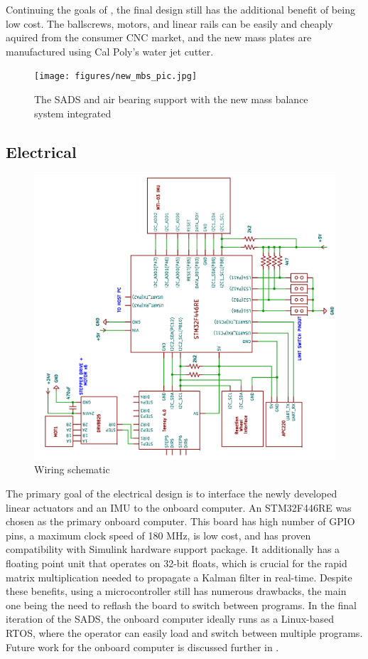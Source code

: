 Continuing the goals of \cite{gilman_automatic_2024}, the final design still has the additional benefit of being low cost. The ballscrews, motors, and linear rails can be easily and cheaply aquired from the consumer CNC market, and the new mass plates are manufactured using Cal Poly's water jet cutter.

\begin{figure}[h]
    \centering
    \texttt{[image: figures/new\_mbs\_pic.jpg]}
    \caption{The SADS and air bearing support with the new mass balance system integrated}
    \label{fig:new_mbs_pic}
\end{figure}

\subsection{Electrical}\label{sec:electrical}

\begin{figure}[h]\label{fig:wiring}
    \centering
    \includegraphics[width=\linewidth,angle=-90]{figures/wiring.png}
    \caption{Wiring schematic}
\end{figure}

The primary goal of the electrical design is to interface the newly developed linear actuators and an IMU to the onboard computer. An STM32F446RE was chosen as the primary onboard computer. This board has high number of GPIO pins, a maximum clock speed of 180 MHz, is low cost, and has proven compatibility with Simulink hardware support package. It additionally has a floating point unit that operates on 32-bit floats, which is crucial for the rapid matrix multiplication needed to propagate a Kalman filter in real-time. Despite these benefits, using a microcontroller still has numerous drawbacks, the main one being the need to reflash the board to switch between programs. In the final iteration of the SADS, the onboard computer ideally runs as a Linux-based RTOS, where the operator can easily load and switch between multiple programs. Future work for the onboard computer is discussed further in .

